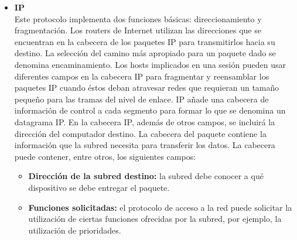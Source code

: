 \documentclass[a4paper,12pt]{article}
\begin{document}
\begin{itemize}
 \item \textbf{IP} \\
 
 Este protocolo implementa dos funciones básicas: direccionamiento y fragmentación. 
 Los routers de Internet utilizan las direcciones que se encuentran en la cabecera de los paquetes IP para transmitirlos hacia su destino. 
 La selección del camino más apropiado para un paquete dado se denomina encaminamiento. Los hosts implicados en una sesión pueden usar diferentes campos
 en la cabecera IP para fragmentar y reensamblar los paquetes IP cuando éstos deban atravesar redes que requieran un tamaño pequeño para las tramas del nivel de enlace. 
 IP añade una cabecera de información de control a cada segmento para formar lo que se denomina un datagrama IP. En la cabecera IP, además de otros campos, se
 incluirá la dirección del computador destino. La cabecera del paquete contiene la información que la subred necesita para transferir los datos. La cabecera
 puede contener, entre otros, los siguientes campos:
 \begin{itemize}
  \item \textbf{Dirección de la subred destino:} la subred debe conocer a qué dispositivo se debe entregar el paquete.
  \item \textbf{Funciones solicitadas:} el protocolo de acceso a la red puede solicitar la utilización de ciertas
  funciones ofrecidas por la subred, por ejemplo, la utilización de prioridades.
 \end{itemize}
 

\end{itemize}
\end{document}
